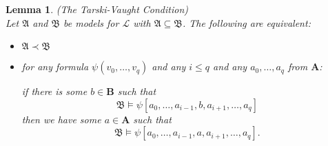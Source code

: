 \documentclass[titlepage, oneside]{amsbook}
\theoremstyle{plain}
\newtheorem{lemma}{Lemma}
\theoremstyle{definition}
\theoremstyle{remark}
\newcommand{\bb}{\ensuremath{\mathbf{B}}}
\begin{document}
\begin{lemma} (The Tarski-Vaught Condition) \\
%
Let $\mathfrak{A}$ and $\mathfrak{B}$ be  models for $\mathcal{L}$ with 
$\mathfrak{A} \subseteq \mathfrak{B}$. The following are equivalent:

\begin{itemize}
\item[(1)] $\mathfrak{A} \prec \mathfrak{B}$
\item[(2)] for any formula $\psi (v_{0}, \dots , v_{q})$ and any $i
\leq q$ 
and any $a_{0}, \dots , a_{q}$ from $\mathbf{A}$:

if there is some $b \in \bb$ such that 
\[ 
\mathfrak{B} \models  \psi [a_{0}, \dots ,a_{i-1},b, a_{i+1} , \dots ,
a_q ] \] then 
we have  some  $a \in \mathbf{A}$ such that \[ \mathfrak{B} \models \psi 
[a_{0}, \dots , a_{i-1}, a , a_{i+1}, \dots ,a_{q}]. \]

\end{itemize}
\end{lemma}
\end{document}
